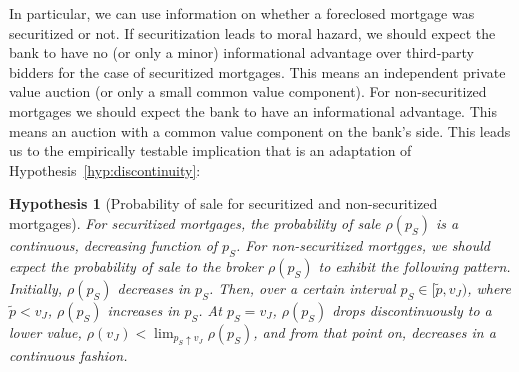 \documentclass[11pt,twopage]{article}
\newtheorem{conjecture}{Hypothesis}
{\bf}{\it}
\begin{document}
In particular, we can use information on whether a foreclosed mortgage
was securitized or not. If securitization leads to moral hazard, we
should expect the bank to have no (or only a minor) informational
advantage over third-party bidders for the case of securitized
mortgages. This means an independent private value auction (or only a
small common value component). For non-securitized mortgages we should
expect the bank to have an informational advantage. This means an
auction with a common value component on the bank's side.  This leads
us to the empirically testable implication that is an adaptation of
Hypothesis~\ref{hyp:discontinuity}:

\begin{conjecture}[Probability of sale for securitized and non-securitized mortgages]\label{hyp:discontinuity-sec-nonsec}
  For securitized mortgages, the probability of sale $\rho(p_S)$ is a
  continuous, decreasing function of $p_S$. For non-securitized
  mortgges, we should expect the probability of sale to the broker
  $\rho(p_S)$ to exhibit the following pattern. Initially, $\rho(p_S)$
  decreases in $p_S$. Then, over a certain interval $p_S \in [\tilde
  p, v_J)$, where $\tilde p < v_J$, $\rho(p_S)$ increases in $p_S$. At
  $p_S = v_J$, $\rho(p_S)$ drops discontinuously to a lower value,
  $\rho(v_J)<\lim_{p_S \uparrow v_J} \rho(p_S)$, and from that point
  on, decreases in a continuous fashion.
\end{conjecture}

%
\end{document}
